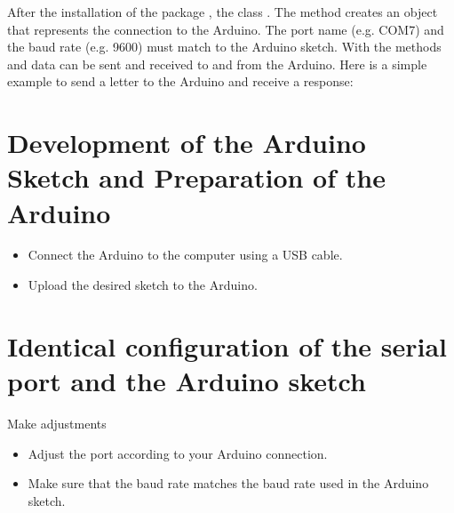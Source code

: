 After the installation of the package , the class .
The method   creates an object that represents the connection to the Arduino. The port name (e.g. COM7) and the baud rate (e.g. 9600) must match to the  Arduino sketch. With the methods  and  data  can be sent and received to and from the Arduino. Here is a simple example to send a letter to the Arduino and receive a response:


{
    \label{Nano:TestSerialPC}
}




\section{Development of the Arduino Sketch and Preparation of the Arduino}

{
  \label{Nano:TestSerial}
}



\bigskip


\begin{itemize}
    \item Connect the Arduino to the computer using a USB cable.
    \item Upload the desired sketch to the Arduino.
\end{itemize}




\section{Identical configuration of the serial port and the Arduino sketch}


Make adjustments

\begin{itemize}
    \item Adjust the port  according to your Arduino connection.
    
    \item Make sure that the baud rate  matches the baud rate used in the Arduino sketch.
\end{itemize}




